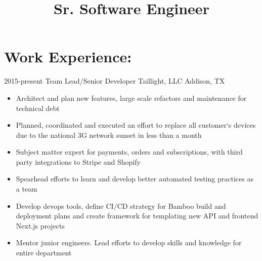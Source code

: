 \documentclass[12pt,sans]{moderncv}
\title{Sr. Software Engineer}
\begin{document}
	\makecvtitle
	

	
	\section{Work Experience:}
	
	\cventry
	{2015-present}
	{Team Lead/Senior Developer}   
	{Taillight, LLC}
	{Addison, TX}{}
	{
		\begin{itemize}
			\item {Architect and plan new features, large scale refactors and maintenance for technical debt} 
			\item {Planned, coordinated and executed an effort to replace all customer`s devices due to the national 3G network sunset in less than a month}
			\item {Subject matter expert for payments, orders and subscriptions, with third party integrations to Stripe and Shopify}
			\item {Spearhead efforts to learn and develop better automated testing practices as a team}
			\item {Develop devops tools, define CI/CD strategy for Bamboo build and deployment plans and create framework for templating new API and frontend Next.js projects}
			\item {Mentor junior engineers. Lead efforts to develop skills and knowledge for entire department}
		\end{itemize}
	}
	
\end{document}
